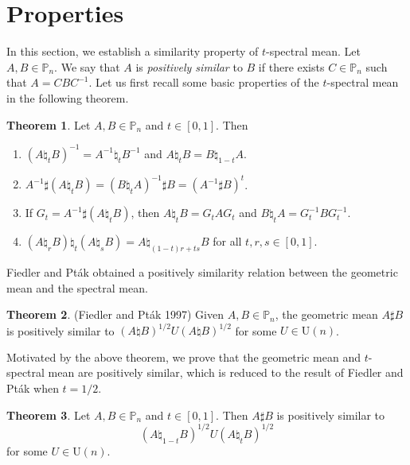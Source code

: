 \documentclass[12pt, reqno]{amsart}
\numberwithin{equation}{section}
\theoremstyle{definition}
\newtheorem{theorem}{Theorem}[section]
\def\P{\mathbb P}
\def\U{\mathrm U}
\begin{document}
\section{Properties}

In this section, we establish a similarity property of $t$-spectral mean. 
Let $A, B\in \P_n$. We say that $A$ is {\it positively similar} to $B$ if there exists $C\in \P_n$ such that $A = CBC^{-1}$.
Let us first recall some basic properties of the $t$-spectral mean~\cite{Bh07, GLT21,LL07} in the following {theorem}.
\begin{theorem} \label{prop:t-spectral}
Let $A, B \in \P_n$ and $t \in [0, 1]$. Then
\begin{enumerate}
\item $(A \natural_t B)^{-1} = A^{-1} \natural_t B^{-1}$ and $A\natural_t B = B \natural_{1-t} A$.
\item $A^{-1} \sharp (A \natural_t B) = (B \natural_t A)^{-1} \sharp B = (A^{-1} \sharp B)^t$. \label{t-natural:2}
\item If $G_t = A^{-1} \sharp (A \natural_t B)$, then $A \natural_t B = G_t A G_t$ and $B \natural_t A ={ G_t^{-1}B G_t^{-1}}$.
\item $(A \natural_r B) \natural_t (A \natural_s B) = A \natural_{(1-t)r+ts} B$ for all ${t, r, s \in [0,1]}$.
\end{enumerate}
\end{theorem}


Fiedler and Pt\'ak \cite [Theorem 5.5(5)]{FP97} obtained a positively similarity relation between the geometric mean and the spectral mean.
\begin{theorem}{(Fiedler and Pt\'ak 1997)}
Given $A, B \in \P_n$, the geometric mean $A\sharp B$ is positively similar to $(A\natural B)^{1/2} U (A\natural B)^{1/2}$ for some $U\in \U(n)$.
\end{theorem}

Motivated by the above theorem, we prove that the geometric mean and $t$-spectral mean are positively similar, which is reduced to the result of Fiedler and Pt\'ak when $t=1/2$. 
\begin{theorem}\label{thm:similar}
Let $A, B \in \P_n$ and $t \in [0, 1]$. Then $A\sharp B$ is positively similar to \[(A\natural_{1-t} B)^{1/2} U (A\natural_t B)^{1/2}\] for some {$U\in \U(n)$}.
\end{theorem}
\end{document}
